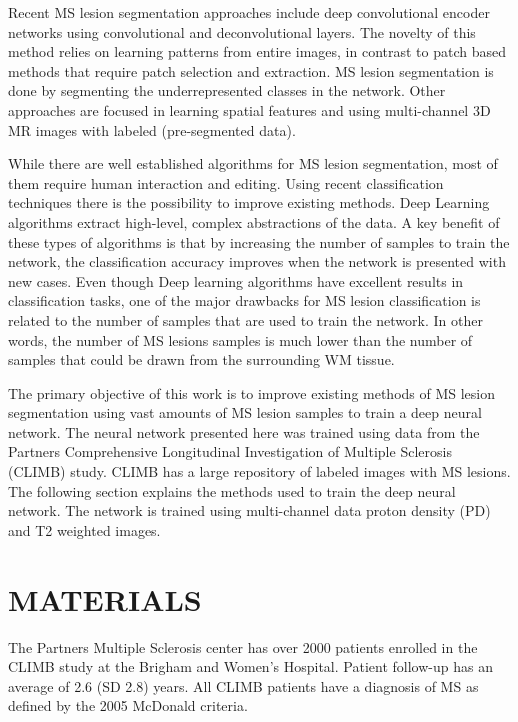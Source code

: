\documentclass[]{spie}  %
\begin{document}
Recent MS lesion segmentation approaches include deep convolutional encoder networks 
using convolutional and deconvolutional layers. The novelty of this method relies on learning patterns from entire images, in contrast to patch based methods that require patch selection and extraction. MS lesion segmentation is done by segmenting the underrepresented classes in the network\cite{brosch2015deep}.
Other approaches are focused in learning spatial features and using multi-channel 3D MR images with labeled (pre-segmented data)\cite{yoo2014deep}.

While there are well established algorithms for MS lesion segmentation, most of them require human interaction and editing.
Using recent classification techniques there is the possibility to improve existing methods. 
Deep Learning algorithms extract high-level, complex abstractions of the data. A key benefit of these types of algorithms is that by increasing the 
number of samples to train the network, the classification accuracy improves when the network is presented with new cases\cite{najafabadi2015deep}. 
Even though Deep learning algorithms have excellent results in classification tasks, one of the major drawbacks for MS lesion classification 
is related to the number of samples that are used to train the network. In other words, 
the number of MS lesions samples is much lower than the number of samples that could be drawn from the surrounding WM tissue. 

The primary objective of this work is to improve existing methods of MS lesion segmentation using vast amounts of MS lesion samples to train a deep neural network.
The neural network presented here was trained using data from the Partners Comprehensive Longitudinal Investigation of Multiple Sclerosis (CLIMB)
study. CLIMB has a large repository of labeled images with MS lesions. 
The following section explains the methods used to train the deep neural network. The network is trained using multi-channel data proton density (PD) and 
T2 weighted images. 

\section{MATERIALS}

The Partners Multiple Sclerosis center has over 2000 patients enrolled in the CLIMB study at the Brigham and Women’s Hospital. Patient follow-up has an average of 2.6 (SD 2.8) years. All CLIMB patients have a diagnosis of MS as defined by the 2005 McDonald criteria. 
\end{document}
